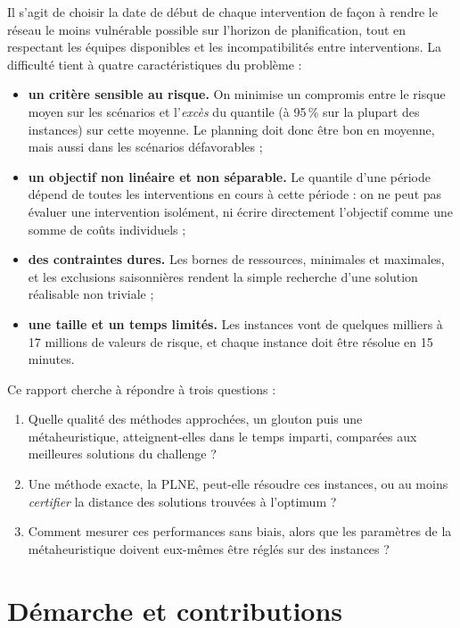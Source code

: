 \documentclass[11pt,a4paper]{report}
\begin{document}
Il s'agit de choisir la date de début de chaque intervention de façon à rendre le réseau le moins
vulnérable possible sur l'horizon de planification, tout en respectant les équipes disponibles et les
incompatibilités entre interventions. La difficulté tient à quatre caractéristiques du problème :
\begin{itemize}
  \item \textbf{un critère sensible au risque.} On minimise un compromis entre le risque moyen sur les
        scénarios et l'\emph{excès} du quantile (à 95\,\% sur la plupart des instances) sur cette
        moyenne. Le planning doit donc être bon en moyenne, mais aussi dans les scénarios
        défavorables ;
  \item \textbf{un objectif non linéaire et non séparable.} Le quantile d'une période dépend de toutes
        les interventions en cours à cette période : on ne peut pas évaluer une intervention
        isolément, ni écrire directement l'objectif comme une somme de coûts individuels ;
  \item \textbf{des contraintes dures.} Les bornes de ressources, minimales et maximales, et les
        exclusions saisonnières rendent la simple recherche d'une solution réalisable non triviale ;
  \item \textbf{une taille et un temps limités.} Les instances vont de quelques milliers à 17 millions
        de valeurs de risque, et chaque instance doit être résolue en 15 minutes.
\end{itemize}

Ce rapport cherche à répondre à trois questions :
\begin{enumerate}[label=\textbf{Q\arabic*.}]
  \item Quelle qualité des méthodes approchées, un glouton puis une métaheuristique, atteignent-elles
        dans le temps imparti, comparées aux meilleures solutions du challenge ?
  \item Une méthode exacte, la PLNE, peut-elle résoudre ces instances, ou au moins \emph{certifier}
        la distance des solutions trouvées à l'optimum ?
  \item Comment mesurer ces performances sans biais, alors que les paramètres de la métaheuristique
        doivent eux-mêmes être réglés sur des instances ?
\end{enumerate}

\section{Démarche et contributions}
\end{document}
